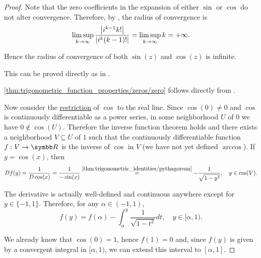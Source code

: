 \begin{proof}
   Note that the zero coefficients in the expansion of either \( \sin \) or \( \cos \) do not alter convergence. Therefore, by , the radius of convergence is
  \begin{equation*}
    \limsup_{k \to \infty} \frac {\left\vert i^{k-1} k! \right\vert} {\left\vert i^k (k-1)! \right\vert}
    =
    \limsup_{k \to \infty} k
    =
    +\infty.
  \end{equation*}

  Hence the radius of convergence of both \( \sin(z) \) and \( \cos(z) \) is infinite.

   This can be proved directly as in .

   \ref{thm:trigonometric_function_properties/zeros/zero} follows directly from .

  Now consider the \hyperref[def:function/extension]{restriction} of \( \cos \) to the real line. Since \( \cos(0) \neq 0 \) and \( \cos \) is continuously differentiable as a power series, in some neighborhood \( U \) of \( 0 \) we have \( 0 \not\in \cos(U) \). Therefore the inverse function theorem holds and there exists a neighborhood \( V \subseteq U \) of \( 1 \) such that the continuously differentiable function \( f: V \to \BR \) is the inverse of \( \cos \) in \( V \) (we have not yet defined \hyperref[def:inverse_trigonometric_functions/arccos]{\( \arccos \)}). If \( y = \cos(x) \), then
  \begin{equation*}
    Df(y)
    =
    \frac 1 {D\cos(x)}
    =
    \frac 1 {-\sin(x)}
    \overset {\ref{thm:trigonometric_identities/pythagorean}} =
    -\frac 1 {\sqrt{1 - y^2}},
    \quad y \in \cos(V).
  \end{equation*}

  The derivative is actually well-defined and continuous anywhere except for \( y \in \{ -1, 1 \} \). Therefore, for any \( \alpha \in (-1, 1) \),
  \begin{equation*}
    f(y) = f(\alpha) - \int_{\alpha}^y \frac 1 {\sqrt{1 - t^2}} dt, \quad y \in [\alpha, 1).
  \end{equation*}

  We already know that \( \cos(0) = 1 \), hence \( f(1) = 0 \) and, since \( f(y) \) is given by a convergent integral in \( [\alpha, 1) \), we can extend this interval to \( [\alpha, 1] \).


\end{proof}
